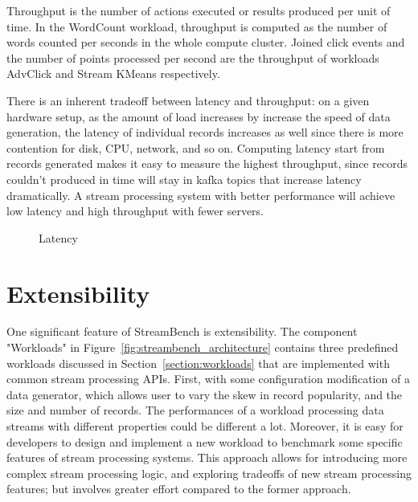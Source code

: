 Throughput is the number of actions executed or results produced per unit of time. In the WordCount workload, throughput is computed as the number of words counted per seconds in the whole compute cluster. Joined click events and the number of points processed per second are the throughput of workloads AdvClick and Stream KMeans respectively.

There is an inherent tradeoff between latency and throughput: on a given hardware setup, as the amount of load increases by increase the speed of data generation, the latency of individual records increases as well since there is more contention for disk, CPU, network, and so on. Computing latency start from records generated makes it easy to measure the highest throughput, since records couldn't produced in time will stay in kafka topics that increase latency dramatically. A stream processing system with better performance will achieve low latency and high throughput with fewer servers.

\begin{figure}
  \begin{center}
   \caption{Latency}
   \label{fig:latency}
  \end{center}
\end{figure}

\section{Extensibility}
\label{section:extensibility}

One significant feature of StreamBench is extensibility. The component "Workloads" in Figure~\ref{fig:streambench_architecture} contains three predefined workloads discussed in Section~\ref{section:workloads} that are implemented with common stream processing APIs. First, with some configuration modification of a data generator, which allows user to vary the skew in record popularity, and the size and number of records. The performances of a workload processing data streams with different properties could be different a lot. Moreover, it is easy for developers to design and implement a new workload to benchmark some specific features of stream processing systems. This approach allows for introducing more complex stream processing logic, and exploring tradeoffs of new stream processing features; but involves greater effort compared to the former approach.

